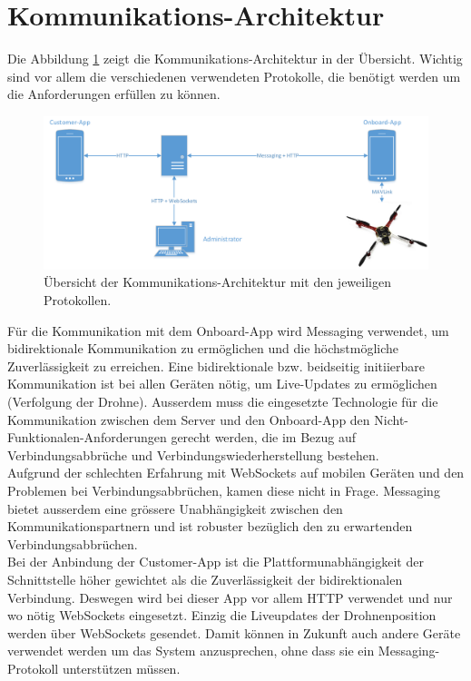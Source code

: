 {\section{Kommunikations-Architektur}
\label{sec:communication-architecture}

Die Abbildung \ref{fig:communication-architecture-overview} zeigt die Kommunikations-Architektur in der Übersicht.
Wichtig sind vor allem die verschiedenen verwendeten Protokolle, die benötigt werden um die Anforderungen erfüllen zu können. \\

\begin{figure}[H]
	\includegraphics[width=1.0\textwidth]{images/Communication-Overview-Diagram.pdf}
	\caption{Übersicht der Kommunikations-Architektur mit den jeweiligen Protokollen. }
	\label{fig:communication-architecture-overview}
\end{figure}


Für die Kommunikation mit dem Onboard-App wird Messaging verwendet, um bidirektionale Kommunikation zu ermöglichen und die höchstmögliche Zuverlässigkeit zu erreichen.
Eine bidirektionale bzw. beidseitig initiierbare Kommunikation ist bei allen Geräten nötig, um Live-Updates zu ermöglichen (Verfolgung der Drohne).
Ausserdem muss die eingesetzte Technologie für die Kommunikation zwischen dem Server und den Onboard-App den Nicht-Funktionalen-Anforderungen gerecht werden, die im Bezug auf Verbindungsabbrüche und Verbindungswiederherstellung bestehen.\\

Aufgrund der schlechten Erfahrung mit WebSockets auf mobilen Geräten und den Problemen bei Verbindungsabbrüchen, kamen diese nicht in Frage. Messaging bietet ausserdem eine grössere Unabhängigkeit zwischen den Kommunikationspartnern und ist robuster bezüglich den zu erwartenden Verbindungsabbrüchen. \\

Bei der Anbindung der Customer-App ist die Plattformunabhängigkeit der Schnittstelle höher gewichtet als die Zuverlässigkeit der bidirektionalen Verbindung. Deswegen wird bei dieser App vor allem HTTP verwendet und nur wo nötig WebSockets eingesetzt. Einzig die Liveupdates der Drohnenposition werden über WebSockets gesendet. Damit können in Zukunft auch andere Geräte verwendet werden um das System anzusprechen, ohne dass sie ein Messaging-Protokoll unterstützen müssen.\\

}
